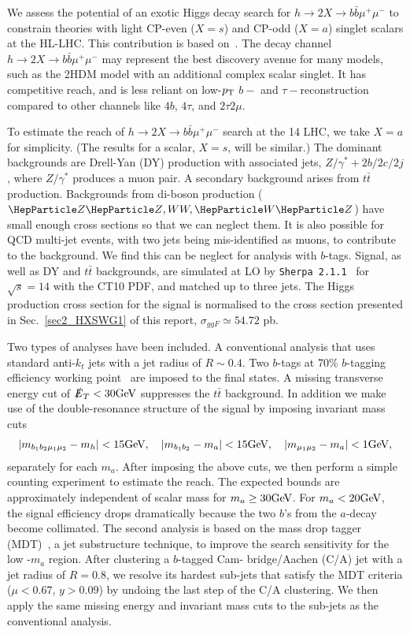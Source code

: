 \label{Sec:2b2muExo}
We assess the potential of an exotic Higgs decay search for $h \to 2X \to b\bar{b}\mu^+ \mu^-$ to constrain theories with light CP-even ($X = s$) and CP-odd ($X = a$) singlet scalars at the HL-LHC. This contribution is based on~\cite{Curtin:2014pda}. The decay channel $h \to 2X \to b\bar{b}\mu^+ \mu^-$ may represent the best discovery avenue for many models, such as the 2HDM model with an additional complex scalar singlet. It has competitive reach, and is less reliant on low-$p_{\rm T}$ $b-$ and $\tau-$reconstruction compared to other channels like $4b$, $4\tau$, and $2\tau2\mu$. 


To estimate the reach of $h \to 2X \to b\bar{b}\mu^+ \mu^-$ search at the 14 \UTeV LHC, we take $X =a$ for simplicity. (The results for a scalar, $X=s$, will be similar.) The dominant backgrounds are Drell-Yan (DY) production with associated jets, \ie $Z/\gamma^*+2b/2c/2j$, where $Z/\gamma^*$ produces a muon pair. A secondary background arises from $t\bar t$ production. Backgrounds from di-boson production ($\PZ\PZ, WW, \PW\PZ$) have small enough cross sections so that we can neglect them. It is also possible for QCD multi-jet events, with two jets being mis-identified as muons, to contribute to the background. We find this can be neglect for analysis with $b$-tags. Signal, as well as DY and $t\bar t$ backgrounds, are simulated at LO by \texttt{Sherpa 2.1.1}~\cite{Gleisberg:2008ta} for $\sqrt{s}=14$ \UTeV with the CT10 PDF, and matched up to three jets. The Higgs production cross section for the signal is normalised to the cross section presented in Sec.~\ref{sec2_HXSWG1} of this report, $\sigma_{ggF} \simeq 54.72$ pb.  



Two types of analyses have been included. A conventional analysis that uses standard anti-$k_t$ jets with a jet radius of $R\sim 0.4$. Two $b$-tags at 70\% $b$-tagging efficiency working point~\cite{ATLAS:2014cal}  are imposed to the final states. A missing transverse energy cut of $\slashed{E}_T < 30 \text{GeV}$ suppresses the $t \bar t$ background. In addition we make use of the double-resonance structure of the signal by imposing invariant mass cuts 
\begin{align}
|m_{b_1 b_2 \mu_1 \mu_2}-m_h|< 15\text{GeV},\quad |m_{b_1 b_2}-m_a|< 15\text{GeV},\quad|m_{\mu_1\mu_2}-m_a| < 1\text{GeV},
\end{align}
separately for each $m_a$. After imposing the above cuts, we then perform a simple counting experiment to estimate the reach. The expected bounds are approximately independent of scalar mass for $m_a \geq 30 \text{GeV}$. For $m_a < 20 \text{GeV}$, the signal efficiency drops dramatically because the two $b$'s from the $a$-decay become collimated. The second analysis is based on the mass drop tagger (MDT)~\cite{Butterworth:2008sd}, a jet substructure technique, to improve the search sensitivity for the low -$m_a$ region. After clustering a $b$-tagged Cam- bridge/Aachen (C/A) jet with a jet radius of $R=0.8$, we resolve its hardest sub-jets that satisfy the MDT criteria ($\mu < 0.67$, $y>0.09$) by undoing the last step of the C/A clustering. We then apply the same missing energy and invariant mass cuts to the sub-jets as the conventional analysis.

